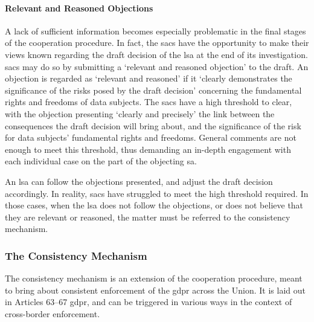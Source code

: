 \paragraph{Relevant and Reasoned Objections}
A lack of sufficient information becomes especially problematic in the final stages of the cooperation procedure.
In fact, the \glspl{sac} have the opportunity to make their views known regarding the draft decision of the \gls{lsa} at the end of its investigation.\autocite[60(3)]{GDPR}
\glspl{sac} may do so by submitting a `relevant and reasoned objection' to the draft.\autocite[60(4)]{GDPR}
An objection is regarded as `relevant and reasoned' if it `clearly demonstrates the significance of the risks posed by the draft decision' concerning the fundamental rights and freedoms of data subjects.\autocite[4(24)]{GDPR}
The \glspl{sac} have a high threshold to clear, with the objection presenting `clearly and precisely' the link between the consequences the draft decision will bring about, and the significance of the risk for data subjects' fundamental rights and freedoms.\autocites[18--19]{edpbGuidelines092020}[811]{gentileDeficientDesign2022}
General comments are not enough to meet this threshold,\autocite[417]{mustertEDPBsteppingup2021} thus demanding an in-depth engagement with each individual case on the part of the objecting \gls{sa}.\autocites[811]{gentileDeficientDesign2022}[466]{hofmannmustertScholtenHandbook2023}

An \gls{lsa} can follow the objections presented, and adjust the draft decision accordingly.\autocite[60(5)]{GDPR}
In reality, \glspl{sac} have struggled to meet the high threshold required.
In those cases, when the \gls{lsa} does not follow the objections, or does not believe that they are relevant or reasoned, the matter must be referred to the consistency mechanism.\autocite[60(4)]{GDPR}

\subsubsection{The Consistency Mechanism}
\label{sec:ch3-consistency-mechanism}

The consistency mechanism is an extension of the cooperation procedure, meant to bring about consistent enforcement of the \gls{gdpr} across the Union.\autocites[63]{GDPR}[68]{googlevCNIL}[52]{facebookBelgium}
It is laid out in Articles 63--67 \gls{gdpr}, and can be triggered in various ways in the context of cross-border enforcement.

